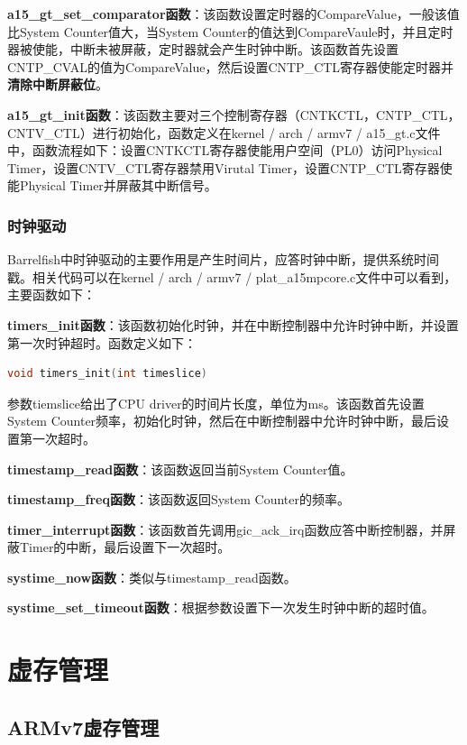 \documentclass[a4paper, 12pt]{report}
\begin{document}
    \textbf{a15\_gt\_set\_comparator函数}：该函数设置定时器的CompareValue，一般该值比System Counter值大，当System Counter的值达到CompareVaule时，并且定时器被使能，中断未被屏蔽，定时器就会产生时钟中断。该函数首先设置CNTP\_CVAL的值为CompareValue，然后设置CNTP\_CTL寄存器使能定时器并\textbf{清除中断屏蔽位}。
    
    \textbf{a15\_gt\_init函数}：该函数主要对三个控制寄存器（CNTKCTL，CNTP\_CTL，CNTV\_CTL）进行初始化，函数定义在kernel / arch / armv7 / a15\_gt.c文件中，函数流程如下：设置CNTKCTL寄存器使能用户空间（PL0）访问Physical Timer，设置CNTV\_CTL寄存器禁用Virutal Timer，设置CNTP\_CTL寄存器使能Physical Timer并屏蔽其中断信号。
    
    \subsection{时钟驱动}
    
    Barrelfish中时钟驱动的主要作用是产生时间片，应答时钟中断，提供系统时间戳。相关代码可以在kernel / arch / armv7 / plat\_a15mpcore.c文件中可以看到，主要函数如下：
    
    \textbf{timers\_init函数}：该函数初始化时钟，并在中断控制器中允许时钟中断，并设置第一次时钟超时。函数定义如下：
    \begin{lstlisting}[language=C]
    void timers_init(int timeslice)
    \end{lstlisting}
    参数tiemslice给出了CPU driver的时间片长度，单位为ms。该函数首先设置System Counter频率，初始化时钟，然后在中断控制器中允许时钟中断，最后设置第一次超时。
    
    \textbf{timestamp\_read函数}：该函数返回当前System Counter值。
    
    \textbf{timestamp\_freq函数}：该函数返回System Counter的频率。
    
    \textbf{timer\_interrupt函数}：该函数首先调用gic\_ack\_irq函数应答中断控制器，并屏蔽Timer的中断，最后设置下一次超时。
    
    \textbf{systime\_now函数}：类似与timestamp\_read函数。
    
    \textbf{systime\_set\_timeout函数}：根据参数设置下一次发生时钟中断的超时值。
    
    \chapter{虚存管理}
    
    \section{ARMv7虚存管理}
    
\end{document}
